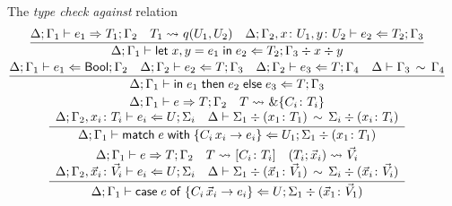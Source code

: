 \begin{figure}[t]
  The \emph{type check against} relation\hfill{}
  \begin{gather*}
    \frac{
      \algtypeout[\Delta ; \Gamma_1]{e_1}{T_1}{\Gamma_2}
      \quad
      T_1 \extract{} q(U_1, U_2)
      \quad
      \algtypein[\Delta; \Gamma_2, x\colon U_1, y\colon U_2]{e_2}{T_2}{\Gamma_3}
    }{
      \algtypein[\Delta;
      \Gamma_1]{\binlete{x}{y}{e_1}{e_2}}{T_2}{\Gamma_3} \div x \div y
    }
    \\
    \frac{
      \algtypein[\Delta;\Gamma_1]{e_1}{\boolt}{\Gamma_2}
      \quad
      \algtypein[\Delta;\Gamma_2]{e_2}{T}{\Gamma_3}
      \quad
      \algtypein[\Delta;\Gamma_2]{e_3}{T}{\Gamma_4}
      \quad
      \ctxequiv{\Gamma_3}{\Gamma_4}
    }{
      \algtypein[\Delta;\Gamma_1]{\conde{e_1}{e_2}{e_3}}{T}{\Gamma_3}
    }
    \\
    \frac{
      \begin{array}{c}
        \algtypeout[\Delta;\Gamma_1]{e}{T}{\Gamma_2}
        \quad
        T \extract{} \&\{C_i\colon T_i\}
        \\
        \algtypein[\Delta;\Gamma_2, x_i\colon T_i]{e_i}{U}{\Sigma_i}
        \quad
        \ctxequiv{\Sigma_1 \div (x_1\colon T_1)}{\Sigma_i \div (x_i\colon T_i)} 
      \end{array}
    }{
      \algtypein[\Delta;\Gamma_1]{\matche{e}{\{C_i\,x_i
          \rightarrow e_i\}}}{U_1}{\Sigma_1 \div (x_1\colon T_1)}
    }
    \\
    \frac{
      \begin{array}{c}
        \algtypeout[\Delta;\Gamma_1]{e}{T}{\Gamma_2}
        \quad
        T \extract{}[C_i\colon T_i]
        \quad
        (T_i;\vec x_i) \extract{}{\vec V_i}
        \\
        \algtypein[\Delta;\Gamma_2, \vec x_i\colon\vec V_i]{e_i}{U}{\Sigma_i}
        \quad
        \ctxequiv{\Sigma_1 \div (\vec x_1\colon\vec V_1)}{\Sigma_i \div (\vec x_i\colon\vec V_i)} 
      \end{array}
    }{
      \algtypein[\Delta;\Gamma_1]{\casee{e}{\{C_i\,\vec x_i\rightarrow e_i\}}}{U}{\Sigma_1 \div (\vec x_1\colon\vec V_1)}
}
\end{gather*}
\end{figure}

